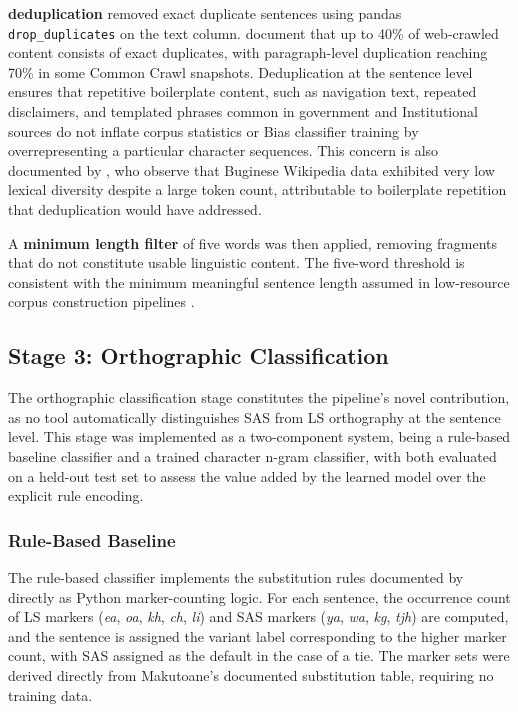 \documentclass[12pt]{ThesisRU}
\begin{document}
\textbf{deduplication} removed exact duplicate sentences using
pandas \texttt{drop\_duplicates} on the text column.
\citet{tatariya2024good} document that up to 40\% of
web-crawled content consists of exact duplicates, with
paragraph-level duplication reaching 70\% in some Common Crawl
snapshots. Deduplication at the sentence level ensures that
repetitive boilerplate content, such as navigation text, repeated
disclaimers, and templated phrases common in government and
Institutional sources do not inflate corpus statistics or
Bias classifier training by overrepresenting a particular character
sequences. This concern is also documented by
\citet{cahyawijaya2023nusawrites}, who observe that Buginese
Wikipedia data exhibited very low lexical diversity despite a large
token count, attributable to boilerplate repetition that deduplication
would have addressed.

A \textbf{minimum length filter} of five words was then applied,
removing fragments that do not constitute usable linguistic content.
The five-word threshold is consistent with the minimum meaningful
sentence length assumed in low-resource corpus construction
pipelines \citep{de2024data}.

\subsection{Stage 3: Orthographic Classification}
The orthographic classification stage constitutes the pipeline's novel contribution, as no tool automatically distinguishes SAS from LS orthography at the sentence level. This stage was implemented as a two-component system, being a rule-based baseline classifier and a trained character n-gram classifier, with both evaluated on a held-out test set to assess the value added by the learned model over the explicit rule encoding.

\subsubsection{Rule-Based Baseline}
\label{sec:rulebased}

The rule-based classifier implements the substitution rules documented by \citet{makutoane2022people} directly as Python
marker-counting logic. For each sentence, the occurrence count of LS
markers (\textit{ea}, \textit{oa}, \textit{kh}, \textit{ch},
\textit{li}) and SAS markers (\textit{ya}, \textit{wa},
\textit{kg}, \textit{tjh}) are computed, and the sentence is
assigned the variant label corresponding to the higher marker count,
with SAS assigned as the default in the case of a tie. The marker
sets were derived directly from Makutoane's documented substitution
table, requiring no training data.
\end{document}
